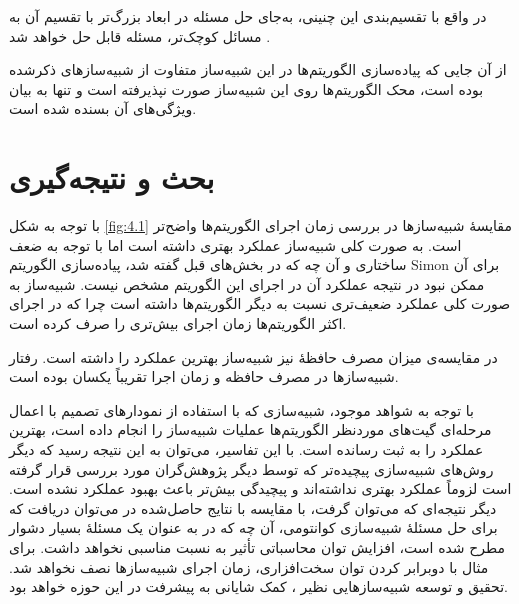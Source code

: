 در واقع با تقسیم‌بندی‌ این چنینی، به‌جای حل مسئله در ابعاد بزرگ‌تر با تقسیم آن به مسائل کوچک‌تر، مسئله قابل حل خواهد شد
\cite{markov_quantum_2018}.

از آن جایی که پیاده‌سازی الگوریتم‌ها در این شبیه‌ساز متفاوت از شبیه‌سازهای ذکرشده بوده است، محک الگوریتم‌ها روی این شبیه‌ساز صورت نپذیرفته است و تنها به بیان ویژگی‌های آن بسنده شده است.


\section{بحث و نتیجه‌گیری}
با توجه به شکل
\ref{fig:4.1}
مقایسهٔ شبیه‌سازها در بررسی زمان اجرای الگوریتم‌ها واضح‌تر است. به صورت کلی شبیه‌ساز
عملکرد بهتری داشته است اما با توجه به ضعف ساختاری و آن چه که در بخش‌های قبل گفته شد، پیاده‌سازی الگوریتم Simon برای آن ممکن نبود در نتیجه عملکرد آن در اجرای این الگوریتم مشخص نیست. شبیه‌ساز
به صورت کلی عملکرد ضعیف‌تری نسبت به دیگر الگوریتم‌ها داشته است چرا که در اجرای اکثر الگوریتم‌ها زمان اجرای بیش‌تری را صرف کرده است.

در مقایسه‌ی میزان مصرف حافظهٔ نیز شبیه‌ساز
بهترین عملکرد را داشته است. رفتار شبیه‌ساز‌ها در مصرف حافظه و زمان اجرا تقریباً یکسان بوده است.

با توجه به شواهد موجود، شبیه‌سازی که با استفاده از نمودارهای تصمیم با اعمال مرحله‌ای گیت‌های موردنظر الگوریتم‌ها عملیات شبیه‌ساز را انجام داده است، بهترین عملکرد را به ثبت رسانده است. با این تفاسیر، می‌توان به این نتیجه رسید که دیگر روش‌های شبیه‌سازی پیچیده‌تر که توسط دیگر پژوهش‌گران مورد بررسی قرار گرفته است لزوماً عملکرد بهتری نداشته‌اند و پیچیدگی بیش‌تر باعث بهبود عملکرد نشده است. دیگر نتیجه‌ای که می‌توان گرفت، با مقایسه با نتایج حاصل‌شده در
\cite{jamadagni_benchmarking_2024}
می‌توان دریافت که برای حل مسئلهٔ شبیه‌سازی کوانتومی، آن چه که در
\cite{xu_herculean_2023}
به عنوان یک مسئلهٔ بسیار دشوار مطرح شده است، افزایش توان محاسباتی تأثیر به نسبت مناسبی نخواهد داشت. برای مثال با دوبرابر کردن توان سخت‌افزاری، زمان اجرای شبیه‌سازها نصف نخواهد شد. تحقیق و توسعه شبیه‌سازهایی نظیر
،
کمک شایانی به پیشرفت در این حوزه خواهد بود.
 
